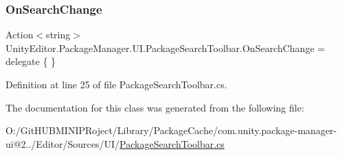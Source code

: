 \mbox{\label{class_unity_editor_1_1_package_manager_1_1_u_i_1_1_package_search_toolbar_a9bc4733cb82e81290e98c859483e0974}} 
\subsubsection{\texorpdfstring{OnSearchChange}{OnSearchChange}}
{\footnotesize\ttfamily Action$<$string$>$ Unity\+Editor.\+Package\+Manager.\+U\+I.\+Package\+Search\+Toolbar.\+On\+Search\+Change = delegate \{ \}}



Definition at line 25 of file Package\+Search\+Toolbar.\+cs.



The documentation for this class was generated from the following file\+:\begin{DoxyCompactItemize}
\item 
O\+:/\+Git\+H\+U\+B\+M\+I\+N\+I\+P\+Roject/\+Library/\+Package\+Cache/com.\+unity.\+package-\/manager-\/ui@2../\+Editor/\+Sources/\+U\+I/\mbox{\hyperlink{_package_search_toolbar_8cs}{Package\+Search\+Toolbar.\+cs}}\end{DoxyCompactItemize}
